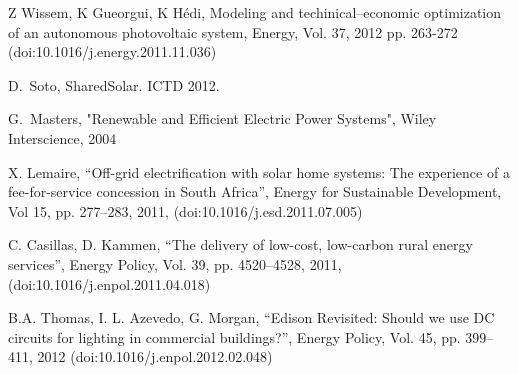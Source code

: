 \documentclass[conference]{IEEEtran}
\begin{document}
\begin{thebibliography}{1}

Z Wissem, K Gueorgui, K H\'edi,
Modeling and techinical--economic optimization of an autonomous
photovoltaic system,
Energy, Vol. 37, 2012 pp. 263-272
(doi:10.1016/j.energy.2011.11.036)

D.~Soto, SharedSolar. ICTD 2012.

G.~Masters,
"Renewable and Efficient Electric Power Systems",
Wiley Interscience,
2004

X. Lemaire,
``Off-grid electrification with solar home systems:
The experience of a fee-for-service concession in South Africa'',
Energy for Sustainable Development,
Vol 15, pp. 277--283, 2011,
(doi:10.1016/j.esd.2011.07.005)

C. Casillas, D. Kammen,
``The delivery of low-cost, low-carbon rural energy services'',
Energy Policy,
Vol. 39, pp. 4520--4528, 2011,
(doi:10.1016/j.enpol.2011.04.018)

B.A. Thomas, I. L. Azevedo, G. Morgan,
``Edison Revisited:
Should we use DC circuits for lighting in commercial buildings?'',
Energy Policy,
Vol. 45, pp. 399--411, 2012
(doi:10.1016/j.enpol.2012.02.048)

\end{thebibliography}
\end{document}
